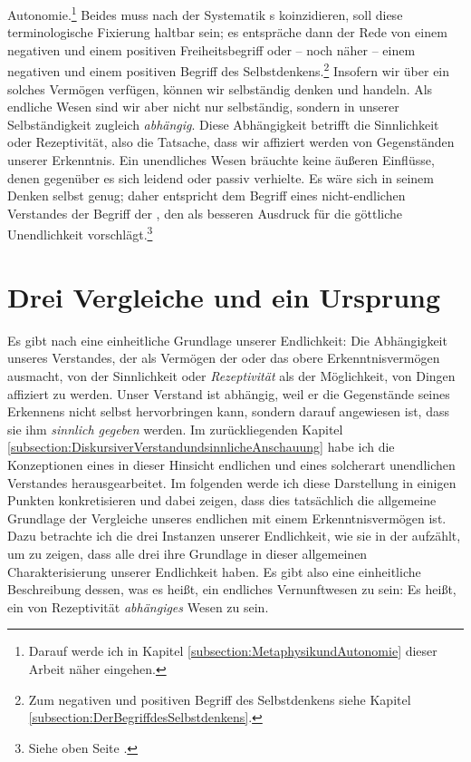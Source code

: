 Autonomie.\footnote{Darauf werde ich in Kapitel
\ref{subsection:MetaphysikundAutonomie} dieser Arbeit näher eingehen.} Beides
muss nach der Systematik s koinzidieren, soll diese
terminologische Fixierung haltbar sein; es entspräche dann der Rede von einem
negativen und einem positiven Freiheitsbegriff oder -- noch näher -- einem
negativen und einem positiven Begriff des Selbstdenkens.\footnote{Zum negativen
und positiven Begriff des Selbstdenkens siehe Kapitel
\ref{subsection:DerBegriffdesSelbstdenkens}.} Insofern wir über ein solches
Vermögen verfügen, können wir selbständig denken und handeln.
Als endliche Wesen sind wir aber nicht nur selbständig, sondern in unserer
Selbständigkeit zugleich \emph{abhängig}. Diese Abhängigkeit betrifft die
Sinnlichkeit oder Rezeptivität, also die Tatsache, dass wir affiziert werden von
Gegenständen unserer Erkenntnis. Ein unendliches Wesen bräuchte keine äußeren
Einflüsse, denen gegenüber es sich leidend oder passiv verhielte. Es wäre sich
in seinem Denken selbst genug; daher entspricht dem Begriff eines nicht-endlichen
Verstandes der Begriff der , den
 als besseren Ausdruck für die göttliche Unendlichkeit
vorschlägt.\footnote{Siehe oben Seite \pageref{Allgenugsamkeit}.}

\section{Drei Vergleiche und ein Ursprung}\label{subsection:Unendlichkeiten}
Es gibt nach  eine einheitliche Grundlage unserer
Endlichkeit: Die Abhängigkeit unseres Verstandes, der als Vermögen der
 oder  das obere
Erkenntnisvermögen ausmacht, von der Sinnlichkeit oder \emph{Rezeptivität} als
der Möglichkeit, von Dingen affiziert zu werden. Unser Verstand ist abhängig,
weil er die Gegenstände seines Erkennens nicht selbst hervorbringen kann,
sondern darauf angewiesen ist, dass sie ihm \emph{sinnlich gegeben} werden. Im
zurückliegenden Kapitel
\ref{subsection:DiskursiverVerstandundsinnlicheAnschauung} habe ich die
Konzeptionen eines in dieser Hinsicht endlichen und eines solcherart unendlichen
Verstandes herausgearbeitet. Im folgenden werde ich diese Darstellung in einigen
Punkten konkretisieren und dabei zeigen, dass dies tatsächlich die allgemeine
Grundlage der Vergleiche unseres endlichen mit einem 
Erkenntnisvermögen ist. Dazu betrachte ich die drei Instanzen unserer
Endlichkeit, wie  sie in der  aufzählt, um zu zeigen, dass alle drei ihre Grundlage in dieser
allgemeinen Charakterisierung unserer Endlichkeit haben. Es gibt also eine
einheitliche Beschreibung dessen, was es heißt, ein endliches Vernunftwesen zu
sein: Es heißt, ein von Rezeptivität \emph{abhängiges} Wesen zu sein.

